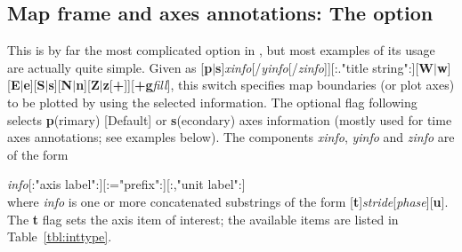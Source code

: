 \subsection{Map frame and axes annotations: The  option}
\label{sec:timeaxis}
This is by far the most complicated option in \GMT, but most examples
of its usage are actually quite simple.
Given as [\textbf{p}$|$\textbf{s}]\emph{xinfo}[/\emph{yinfo}[/\emph{zinfo}]][:."title
string":][\textbf{W}$|$\textbf{w}][\textbf{E}$|$\textbf{e}][\textbf{S}$|$\textbf{s}][\textbf{N}$|$\textbf{n}][\textbf{Z}$|$\textbf{z}[\textbf{+}]][\textbf{+g}\emph{fill}],
this switch specifies map boundaries (or plot axes) to be plotted by using the
selected information. The optional flag following  selects \textbf{p}(rimary) [Default] or \textbf{s}(econdary)
axes information (mostly used for time axes annotations; see examples below).
The components \emph{xinfo}, \emph{yinfo} and \emph{zinfo} are of the form \\

\par \emph{info}[:"axis label":][:="prefix":][:,"unit label":] \\

\noindent
where \emph{info} is one or more concatenated substrings of the form
[\textbf{t}]\emph{stride}[\emph{phase}][\textbf{u}].  The \textbf{t} flag sets the axis item of interest; the
available items are listed in Table~\ref{tbl:inttype}.

